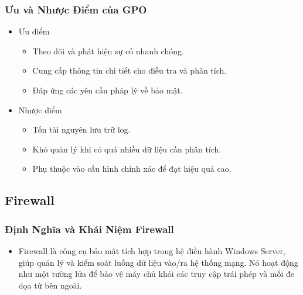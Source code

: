 \documentclass[13pt]{article}
\begin{document}
                \subsubsection{Ưu và Nhược Điểm của GPO}
                \begin{itemize}
                    \item Ưu điểm
                    \begin{itemize}
                        \item Theo dõi và phát hiện sự cố nhanh chóng.
                        \item Cung cấp thông tin chi tiết cho điều tra và phân tích.
                        \item Đáp ứng các yêu cầu pháp lý về bảo mật.
                        
                    \end{itemize}
    
                    \item Nhược điểm
                    \begin{itemize}
                        \item Tốn tài nguyên lưu trữ log.
                        \item Khó quản lý khi có quá nhiều dữ liệu cần phân tích.
                        \item Phụ thuộc vào cấu hình chính xác để đạt hiệu quả cao.
                        
                    \end{itemize}
                    \end{itemize}
                    
            \subsection{Firewall}
                \subsubsection{Định Nghĩa và Khái Niệm Firewall }
                \begin{itemize}
                \item Firewall là công cụ bảo mật tích hợp trong hệ điều hành Windows Server, giúp quản lý và kiểm soát luồng dữ liệu vào/ra hệ thống mạng. Nó hoạt động như một tường lửa để bảo vệ máy chủ khỏi các truy cập trái phép và mối đe dọa từ bên ngoài.
                \end{itemize}
\end{document}
